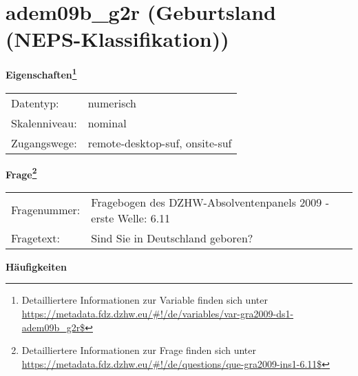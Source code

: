 
    \setcounter{footnote}{0}

    \vspace*{-1.8cm}
	\section{adem09b\_g2r (Geburtsland (NEPS-Klassifikation))}
	\label{section:adem09b_g2r}



    \vspace*{0.5cm}
    \noindent\textbf{Eigenschaften\footnote{Detailliertere Informationen zur Variable finden sich unter
		\url{https://metadata.fdz.dzhw.eu/\#!/de/variables/var-gra2009-ds1-adem09b_g2r$}}}\\
	\begin{tabularx}{\hsize}{@{}lX}
	Datentyp: & numerisch \\
	Skalenniveau: & nominal \\
	Zugangswege: &
	  remote-desktop-suf, 
	  onsite-suf
 \\
    \end{tabularx}



				\vspace*{0.5cm}
                \noindent\textbf{Frage\footnote{Detailliertere Informationen zur Frage finden sich unter
		              \url{https://metadata.fdz.dzhw.eu/\#!/de/questions/que-gra2009-ins1-6.11$}}}\\
				\begin{tabularx}{\hsize}{@{}lX}
					Fragenummer: &
					  Fragebogen des DZHW-Absolventenpanels 2009 - erste Welle:
					  6.11
 \\
					Fragetext: & Sind Sie in Deutschland geboren? \\
				\end{tabularx}





        		\vspace*{0.5cm}
                \noindent\textbf{Häufigkeiten}

